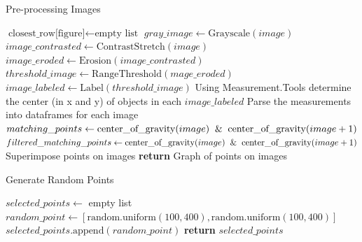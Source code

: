 \documentclass{article}
\begin{document}
\begin{algorithm}[h!]
\caption{Pre-processing Images}\label{algo:cell-trace}
\begin{algorithmic}[1]
    \State $\text{closest\_row[figure]} \gets \text{empty list}$
        \State $gray\_image \gets \text{Grayscale}(image)$
        \State $image\_contrasted \gets \text{ContrastStretch}(image)$
        \State $image\_eroded \gets \text{Erosion}(image\_contrasted)$
        \State $threshold\_image \gets \text{RangeThreshold}(mage\_eroded)$
        \State $image\_labeled \gets \text{Label}(threshold\_image)$
        \State Using Measurement.Tools determine the center (in x and y) of objects in each $image\_labeled$
        \State Parse the measurements into dataframes for each image 
    \EndFor
        \State $matching\_points \gets \text{center\_of\_gravity}(image) \And \text{center\_of\_gravity}(image+1)$
        \State $filtered\_matching\_points \gets \text{center\_of\_gravity}(image) \And \text{center\_of\_gravity}(image+1)$
        \State Superimpose points on images
    \EndFor
    \State \textbf{return} Graph of points on images
\EndProcedure
\end{algorithmic}
\end{algorithm}

\begin{algorithm}[h!]
\caption{Generate Random Points}\label{algo:generate-random-points}
\begin{algorithmic}[1]
    \State $selected\_points \gets$ empty list
        \State $random\_point \gets [\text{random.uniform}(100, 400), \text{random.uniform}(100, 400)]$
        \State $selected\_points.\text{append}(random\_point)$
    \EndFor
    \State \textbf{return} $selected\_points$
\EndFunction
\end{algorithmic}
\end{algorithm}
\end{document}
